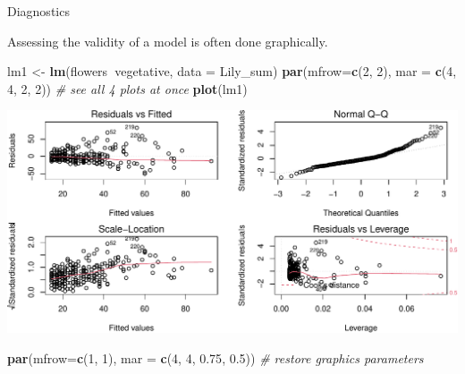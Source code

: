 \documentclass[
  ignorenonframetext,
]{beamer}
\newenvironment{Shaded}{\begin{snugshade}}{\end{snugshade}}
\newcommand{\CommentTok}[1]{\textcolor[rgb]{0.56,0.35,0.01}{\textit{#1}}}
\newcommand{\DataTypeTok}[1]{\textcolor[rgb]{0.13,0.29,0.53}{#1}}
\newcommand{\DecValTok}[1]{\textcolor[rgb]{0.00,0.00,0.81}{#1}}
\newcommand{\FloatTok}[1]{\textcolor[rgb]{0.00,0.00,0.81}{#1}}
\newcommand{\KeywordTok}[1]{\textcolor[rgb]{0.13,0.29,0.53}{\textbf{#1}}}
\newcommand{\NormalTok}[1]{#1}
\newcommand{\OperatorTok}[1]{\textcolor[rgb]{0.81,0.36,0.00}{\textbf{#1}}}
\newcommand{\StringTok}[1]{\textcolor[rgb]{0.31,0.60,0.02}{#1}}
\begin{document}
\begin{frame}[fragile]{Diagnostics}
\protect\hypertarget{diagnostics}{}

Assessing the validity of a model is often done graphically. \scriptsize

\begin{Shaded}
\begin{Highlighting}[]
\NormalTok{lm1 <-}\StringTok{ }\KeywordTok{lm}\NormalTok{(flowers}\OperatorTok{~}\NormalTok{vegetative, }\DataTypeTok{data =}\NormalTok{ Lily_sum)}
\KeywordTok{par}\NormalTok{(}\DataTypeTok{mfrow=}\KeywordTok{c}\NormalTok{(}\DecValTok{2}\NormalTok{, }\DecValTok{2}\NormalTok{), }\DataTypeTok{mar =} \KeywordTok{c}\NormalTok{(}\DecValTok{4}\NormalTok{, }\DecValTok{4}\NormalTok{, }\DecValTok{2}\NormalTok{, }\DecValTok{2}\NormalTok{)) }\CommentTok{# see all 4 plots at once}
\KeywordTok{plot}\NormalTok{(lm1)}
\end{Highlighting}
\end{Shaded}

\includegraphics{data_viz_files/figure-beamer/unnamed-chunk-13-1.pdf}

\begin{Shaded}
\begin{Highlighting}[]
\KeywordTok{par}\NormalTok{(}\DataTypeTok{mfrow=}\KeywordTok{c}\NormalTok{(}\DecValTok{1}\NormalTok{, }\DecValTok{1}\NormalTok{), }\DataTypeTok{mar =} \KeywordTok{c}\NormalTok{(}\DecValTok{4}\NormalTok{, }\DecValTok{4}\NormalTok{, }\FloatTok{0.75}\NormalTok{, }\FloatTok{0.5}\NormalTok{)) }\CommentTok{# restore graphics parameters}
\end{Highlighting}
\end{Shaded}

\end{frame}
\end{document}
